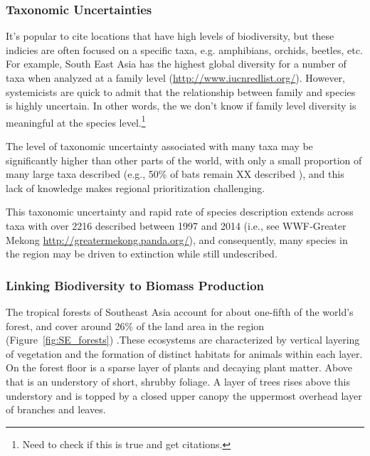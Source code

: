 \subsubsection{Taxonomic Uncertainties}

It's popular to cite locations that have high levels of biodiversity, but these indicies are often focused on a specific taxa, e.g. amphibians, orchids, beetles, etc. For example, South East Asia has the highest global diversity for a number of taxa when analyzed at a family level (\url{http://www.iucnredlist.org/}). However, systemicists are quick to admit that the relationship between family and species is highly uncertain. In other words, the we don't know if family level diversity is meaningful at the species level.\footnote{Need to check if this is true and get citations.}

The level of taxonomic uncertainty associated with many taxa may be significantly higher than other parts of the world, with only a small proportion of many large taxa described (e.g., 50\% of bats remain XX described \citep{francis2010role}), and this lack of knowledge makes regional prioritization challenging. 

This taxonomic uncertainty and rapid rate of species description extends across taxa with over 2216 described between 1997 and 2014 (i.e., see WWF‐Greater Mekong \url{http://greatermekong.panda.org/}), and consequently, many species in the region may be driven to extinction while still undescribed.

\subsubsection{Linking Biodiversity to Biomass Production}
  
The tropical forests of Southeast Asia account for about one-fifth of the world's forest, and cover around 26\% of the land area in the region (Figure~\ref{fig:SE_forests}) \citep{brown2003state}.These ecosystems are characterized by vertical layering of vegetation and the formation of distinct habitats for animals within each layer. On the forest floor is a sparse layer of plants and decaying plant matter. Above that is an understory of short, shrubby foliage. A layer of trees rises above this understory and is topped by a closed upper canopy the uppermost overhead layer of branches and leaves.
  
